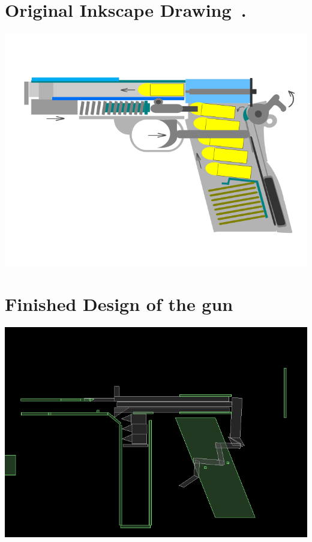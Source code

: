 \documentclass [11pt]{report}
\begin{document}
\section{Original Inkscape Drawing~\cite{ink}.} 

\begin{center}
\includegraphics[scale=0.6]{./images/gunink.png}
\end{center}
\section{Finished Design of the gun}
\begin{center}
\includegraphics[scale=0.5]{./images/gun.png}
\end{center}
\end{document}
